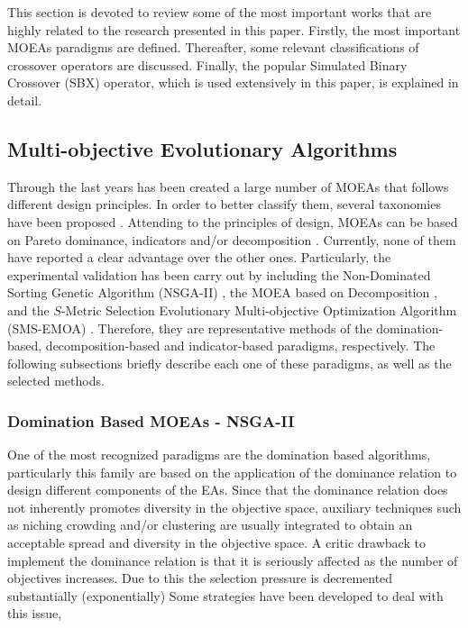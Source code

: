 
This section is devoted to review some of the most important works that are highly related to the research presented in this paper.
%
Firstly, the most important MOEAs paradigms are defined.
%
Thereafter, some relevant classifications of crossover operators are discussed.
%
Finally, the popular Simulated Binary Crossover (SBX) operator, which is used extensively in this paper, is explained in detail.

\subsection{Multi-objective Evolutionary Algorithms}

Through the last years has been created a large number of MOEAs that follows different design principles.
%
In order to better classify them, several taxonomies have been proposed \cite{Joel:BOOK_MOEAs}.
%
Attending to the principles of design, MOEAs can be based on Pareto dominance, indicators and/or decomposition \cite{pilat2010evolutionary}.
%
Currently, none of them have reported a clear advantage over the other ones.
%
Particularly, the experimental validation has been carry out by including the Non-Dominated Sorting Genetic Algorithm (NSGA-II) \cite{Joel:NSGAII}, the MOEA based on Decomposition \cite{Joel:MOEAD}, and the $S$-Metric Selection Evolutionary Multi-objective Optimization Algorithm (SMS-EMOA) \cite{Joel:SMSEMOA}.
%
Therefore, they are representative methods of the domination-based, decomposition-based and indicator-based paradigms, respectively.
%
The following subsections briefly describe each one of these paradigms, as well as the selected methods.

\subsubsection{Domination Based MOEAs - NSGA-II}

One of the most recognized paradigms are the domination based algorithms, particularly this family are based on the application of the dominance relation to design different components of the EAs.
%
Since that the dominance relation does not inherently promotes diversity in the objective space, auxiliary techniques such as niching crowding and/or clustering are usually integrated to obtain an acceptable spread and diversity in the objective space.
%
A critic drawback to implement the dominance relation is that it is seriously affected as the number of objectives increases.
%
Due to this the selection pressure is decremented substantially (exponentially)
%
Some strategies have been developed to deal with this issue,
%

